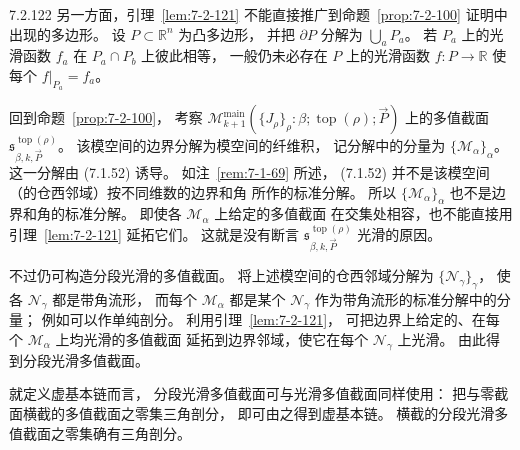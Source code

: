 \begin{remark}{7.2.122}\label{rem:7-2-122}
另一方面，引理~\ref{lem:7-2-121}
不能直接推广到命题~\ref{prop:7-2-100}
证明中出现的多边形。
设 $P\subset\mathbb R^n$ 为凸多边形，
并把 $\partial P$ 分解为 $\bigcup_aP_a$。
若 $P_a$ 上的光滑函数 $f_a$
在 $P_a\cap P_b$ 上彼此相等，
一般仍未必存在 $P$ 上的光滑函数
$f\colon P\to\mathbb R$
使每个 $f|_{P_a}=f_a$。

回到命题~\ref{prop:7-2-100}，
考察
$\mathcal M^{\mathrm{main}}_{k+1}
(\{J_\rho\}_\rho:\beta;
\operatorname{top}(\rho);\vec P)$
上的多值截面
$\mathfrak s^{\operatorname{top}(\rho)}_{\beta,k,\vec P}$。
该模空间的边界分解为模空间的纤维积，
记分解中的分量为 $\{\mathcal M_\alpha\}_\alpha$。
这一分解由 (7.1.52) 诱导。
如注~\ref{rem:7-1-69} 所述，
(7.1.52) 并不是该模空间
（的仓西邻域）按不同维数的边界和角
所作的标准分解。
所以 $\{\mathcal M_\alpha\}_\alpha$
也不是边界和角的标准分解。
即使各 $\mathcal M_\alpha$ 上给定的多值截面
在交集处相容，也不能直接用
引理~\ref{lem:7-2-121} 延拓它们。
这就是没有断言
$\mathfrak s^{\operatorname{top}(\rho)}_{\beta,k,\vec P}$
光滑的原因。

不过仍可构造分段光滑的多值截面。
将上述模空间的仓西邻域分解为
$\{\mathcal N_\gamma\}_\gamma$，
使各 $\mathcal N_\gamma$ 都是带角流形，
而每个 $\mathcal M_\alpha$
都是某个 $\mathcal N_\gamma$
作为带角流形的标准分解中的分量；
例如可以作单纯剖分。
利用引理~\ref{lem:7-2-121}，
可把边界上给定的、在每个
$\mathcal M_\alpha$ 上均光滑的多值截面
延拓到边界邻域，使它在每个
$\mathcal N_\gamma$ 上光滑。
由此得到分段光滑多值截面。

就定义虚基本链而言，
分段光滑多值截面可与光滑多值截面同样使用：
把与零截面横截的多值截面之零集三角剖分，
即可由之得到虚基本链。
横截的分段光滑多值截面之零集确有三角剖分。
\end{remark}

